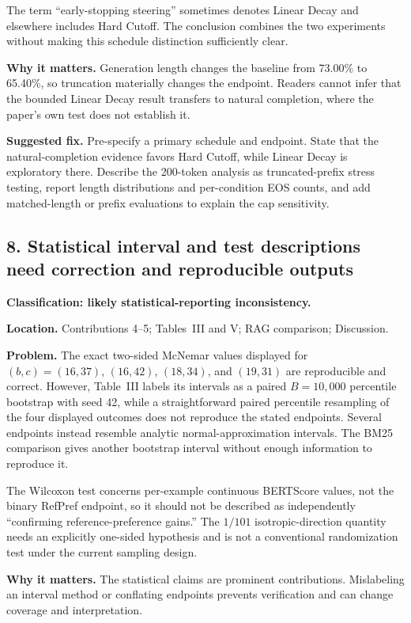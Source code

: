 \documentclass[11pt]{article}
\begin{document}
The term ``early-stopping steering'' sometimes denotes Linear Decay and elsewhere includes Hard Cutoff.  The conclusion combines the two experiments without making this schedule distinction sufficiently clear.

\textbf{Why it matters.} Generation length changes the baseline from 73.00\% to 65.40\%, so truncation materially changes the endpoint.  Readers cannot infer that the bounded Linear Decay result transfers to natural completion, where the paper's own test does not establish it.

\textbf{Suggested fix.} Pre-specify a primary schedule and endpoint.  State that the natural-completion evidence favors Hard Cutoff, while Linear Decay is exploratory there.  Describe the 200-token analysis as truncated-prefix stress testing, report length distributions and per-condition EOS counts, and add matched-length or prefix evaluations to explain the cap sensitivity.

\subsection*{8. Statistical interval and test descriptions need correction and reproducible outputs}

\textbf{Classification: likely statistical-reporting inconsistency.}

\textbf{Location.} Contributions 4--5; Tables~III and V; RAG comparison; Discussion.

\textbf{Problem.} The exact two-sided McNemar values displayed for $(b,c)=(16,37)$, $(16,42)$, $(18,34)$, and $(19,31)$ are reproducible and correct.  However, Table~III labels its intervals as a paired $B=10{,}000$ percentile bootstrap with seed 42, while a straightforward paired percentile resampling of the four displayed outcomes does not reproduce the stated endpoints.  Several endpoints instead resemble analytic normal-approximation intervals.  The BM25 comparison gives another bootstrap interval without enough information to reproduce it.

The Wilcoxon test concerns per-example continuous BERTScore values, not the binary RefPref endpoint, so it should not be described as independently ``confirming reference-preference gains.''  The $1/101$ isotropic-direction quantity needs an explicitly one-sided hypothesis and is not a conventional randomization test under the current sampling design.

\textbf{Why it matters.} The statistical claims are prominent contributions.  Mislabeling an interval method or conflating endpoints prevents verification and can change coverage and interpretation.
\end{document}
